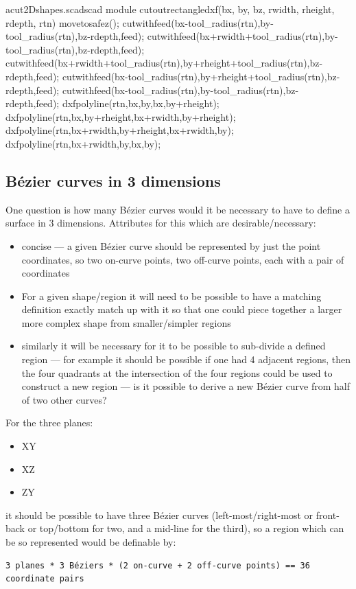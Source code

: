 \documentclass{ltxdoc}
\begin{document}
\lstset{firstnumber=\thecuttwod}
\begin{writecode}{a}{cut2Dshapes.scad}{scad}
module cutoutrectangledxf(bx, by, bz, rwidth, rheight, rdepth, rtn) {
  movetosafez();
  cutwithfeed(bx-tool_radius(rtn),by-tool_radius(rtn),bz-rdepth,feed);
  cutwithfeed(bx+rwidth+tool_radius(rtn),by-tool_radius(rtn),bz-rdepth,feed);
  cutwithfeed(bx+rwidth+tool_radius(rtn),by+rheight+tool_radius(rtn),bz-rdepth,feed);
  cutwithfeed(bx-tool_radius(rtn),by+rheight+tool_radius(rtn),bz-rdepth,feed);
  cutwithfeed(bx-tool_radius(rtn),by-tool_radius(rtn),bz-rdepth,feed);
  dxfpolyline(rtn,bx,by,bx,by+rheight);
  dxfpolyline(rtn,bx,by+rheight,bx+rwidth,by+rheight);
  dxfpolyline(rtn,bx+rwidth,by+rheight,bx+rwidth,by);
  dxfpolyline(rtn,bx+rwidth,by,bx,by);
}

\end{writecode}
\addtocounter{cuttwod}{13}

\subsection{Bézier curves in 3 dimensions}
 
One question is how many Bézier curves would it be necessary to have to define a surface
in 3 dimensions. Attributes for this which are desirable/necessary:

\begin{itemize}
\item concise --- a given Bézier curve should be represented by just the point coordinates, 
      so two on-curve points, two off-curve points, each with a pair of coordinates
\item For a given shape/region it will need to be possible to have a matching definition 
      exactly match up with it so that one could piece together a larger more complex shape 
      from smaller/simpler regions
\item similarly it will be necessary for it to be possible to sub-divide a defined region --- 
      for example it should be possible if one had 4 adjacent regions, then the four quadrants 
      at the intersection of the four regions could be used to construct a new region --- is it
      possible to derive a new Bézier curve from half of two other curves?
\end{itemize}

\begin{samepage}
For the three planes:

\begin{itemize}
 \item XY
 \item XZ
 \item ZY
\end{itemize}
 
\noindent it should be possible to have three Bézier curves (left-most/right-most or front-back or 
top/bottom for two, and a mid-line for the third), so a region which can be so represented would 
be definable by:
 
\begin{verbatim}
3 planes * 3 Béziers * (2 on-curve + 2 off-curve points) == 36 coordinate pairs
\end{verbatim}
\end{samepage}
 
\end{document}
